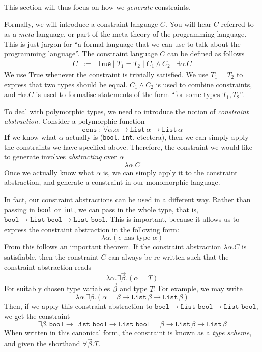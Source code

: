 {This section will thus focus on how we \textit{generate} constraints.

Formally, we will introduce a constraint language $C$. You will hear $C$ referred to as a \textit{meta}-language, or part of the meta-theory of the programming language. This is just jargon for ``a formal language that we can use to talk about the programming language''. The constraint language $C$ can be defined as follows
\[\begin{array}{lcl}
     C&:=&\textsf{True} \mid T_1 = T_2 \mid C_1 \land C_2 \mid \exists \alpha . C 
     \end{array}\]
We use \textsf{True} whenever the constraint is trivially satisfied. We use $T_1 = T_2$ to express that two types should be equal. $C_1 \land C_2$ is used to combine constraints, and $\exists \alpha. C$ is used to formalise statements of the form ``for some types $T_1, T_2$''. 

To deal with polymorphic types, we need to introduce the notion of \textit{constraint abstraction}. Consider a polymorphic function
\[ \texttt{cons}\, : \; \forall \alpha . \alpha \to \texttt{List} \, \alpha \to \texttt{List} \, \alpha \]
\textbf{If} we know what $\alpha$ actually is (\texttt{bool}, \texttt{int}, etcetera), then we can simply apply the constraints we have specified above. Therefore, the constraint we would like to generate involves \textit{abstracting} over $\alpha$
\[\lambda \alpha. C\]
Once we actually know what $\alpha$ is, we can simply apply it to the constraint abstraction, and generate a constraint in our monomorphic language.

In fact, our constraint abstractions can be used in a different way. Rather than passing in \texttt{bool} or \texttt{int}, we can pass in the whole type, that is, $\texttt{bool} \to \texttt{List bool} \to \texttt{List bool}$. This is important, because it allows us to express the constraint abstraction in the following form:
\[ \lambda \alpha. (e \text{ has type } \alpha) \]
From this follows an important theorem. If the constraint abstraction $\lambda \alpha. C$ is satisfiable, then the constraint $C$ can always be re-written such that the constraint abstraction reads
\[\lambda \alpha. \exists \vec{\beta}. (\alpha = T)\]
For suitably chosen type variables $\vec{\beta}$ and  type $T$. For example, we may write
\[\lambda \alpha. \exists \beta. (\alpha = \beta \to \texttt{List}\, \beta \to \texttt{List}\, \beta)\]
Then, if we apply this constraint abstraction to $\texttt{bool} \to \texttt{List bool} \to \texttt{List bool}$, we get the constraint
\[\exists \beta . \, \texttt{bool} \to \texttt{List bool} \to \texttt{List bool} = \beta \to \texttt{List}\, \beta \to \texttt{List}\, \beta\]
When written in this canonical form, the constraint is known as a \textit{type scheme}, and given the shorthand $\forall \vec{\beta}. T$. 

}
